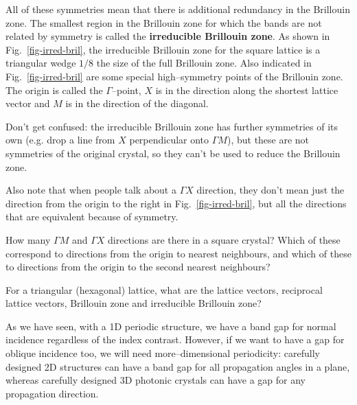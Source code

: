 All of these symmetries mean that there is additional redundancy in the Brillouin zone. The smallest region in the Brillouin zone for which the bands are not related by symmetry is called the \textbf{irreducible Brillouin zone}. As shown in Fig.~\ref{fig-irred-bril}, the irreducible Brillouin zone for the square lattice is a triangular wedge $1/8$ the size of the full Brillouin zone. Also indicated in Fig.~\ref{fig-irred-bril} are some special high--symmetry points of the Brillouin zone. The origin is called the $\Gamma$--point, $X$ is in the direction along the shortest lattice vector and $M$ is in the direction of the diagonal.

Don't get confused: the irreducible Brillouin zone has further symmetries of its own (e.g. drop a line from $X$ perpendicular onto $\Gamma M$), but these are not symmetries of the original crystal, so they can't be used to reduce the Brillouin zone.

Also note that when people talk about a $\Gamma X$ direction, they don't mean just the direction from the origin to the right in Fig.~\ref{fig-irred-bril}, but all the directions that are equivalent because of symmetry.

\begin{exer}
How many $\Gamma M$ and $\Gamma X$ directions are there in a square crystal? Which of these correspond to directions from the origin to nearest neighbours, and which of these to directions from the origin to the second nearest neighbours?
\end{exer}


\begin{exer}
For a triangular (hexagonal) lattice, what are the lattice vectors, reciprocal lattice vectors, Brillouin zone and irreducible Brillouin zone?
\end{exer}

\pagebreak


As we have seen, with a 1D periodic structure, we have a band gap for normal incidence regardless of the index contrast. However, if we want to have a gap for oblique incidence too, we will need more--dimensional periodicity: carefully designed 2D structures can have a band gap for all propagation angles in a plane, whereas carefully designed 3D photonic crystals can have a gap for any propagation direction.

